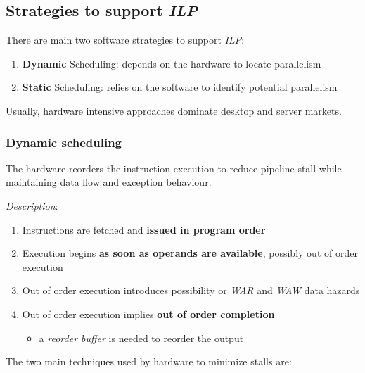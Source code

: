 \documentclass[english]{article}
\begin{document}
\subsection{Strategies to support \textit{ILP}}
\label{sec:strategies-to-support-ilp}

There are main two software strategies to support \textit{ILP}:

\begin{enumerate}
  \item \textbf{Dynamic} Scheduling: depends on the hardware to locate parallelism
  \item \textbf{Static} Scheduling: relies on the software to identify potential parallelism
\end{enumerate}

Usually, hardware intensive approaches dominate desktop and server markets.

\subsubsection{Dynamic scheduling}

The hardware reorders the instruction execution to reduce pipeline stall while maintaining data flow and exception behaviour.

\bigskip
\textit{Description}:
\begin{enumerate}
  \item Instructions are fetched and \textbf{issued in program order}
  \item Execution begins \textbf{as soon as operands are available}, possibly out of order execution
  \item Out of order execution introduces possibility or \textit{WAR} and \textit{WAW} data hazards
  \item Out of order execution implies \textbf{out of order completion}
        \begin{itemize}[label=\(\rightarrow\)]
          \item a \textit{reorder buffer} is needed to reorder the output
        \end{itemize}
\end{enumerate}

\bigskip
The two main techniques used by hardware to minimize stalls are:
\end{document}
